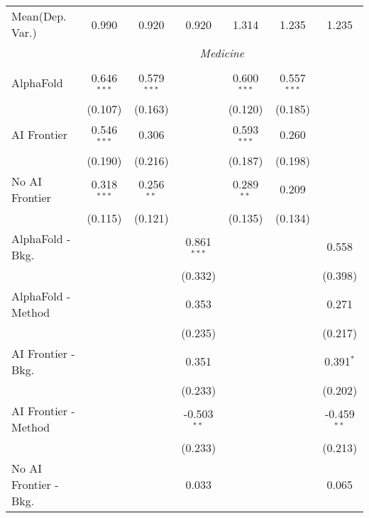\begin{tabular}{lcccccc}
Mean(Dep. Var.) & 0.990 & 0.920 & 0.920 & 1.314 & 1.235 & 1.235 \\
 & \multicolumn{6}{c}{\textit{Medicine}} \\ \\
   AlphaFold               & 0.646$^{***}$ & 0.579$^{***}$ &               & 0.600$^{***}$ & 0.557$^{***}$ &   \\   
                           & (0.107)       & (0.163)       &               & (0.120)       & (0.185)       &   \\   
   AI Frontier             & 0.546$^{***}$ & 0.306         &               & 0.593$^{***}$ & 0.260         &   \\   
                           & (0.190)       & (0.216)       &               & (0.187)       & (0.198)       &   \\   
   No AI Frontier          & 0.318$^{***}$ & 0.256$^{**}$  &               & 0.289$^{**}$  & 0.209         &   \\   
                           & (0.115)       & (0.121)       &               & (0.135)       & (0.134)       &   \\   
   AlphaFold - Bkg.        &               &               & 0.861$^{***}$ &               &               & 0.558\\   
                           &               &               & (0.332)       &               &               & (0.398)\\   
   AlphaFold - Method      &               &               & 0.353         &               &               & 0.271\\   
                           &               &               & (0.235)       &               &               & (0.217)\\   
   AI Frontier - Bkg.      &               &               & 0.351         &               &               & 0.391$^{*}$\\   
                           &               &               & (0.233)       &               &               & (0.202)\\   
   AI Frontier - Method    &               &               & -0.503$^{**}$ &               &               & -0.459$^{**}$\\   
                           &               &               & (0.233)       &               &               & (0.213)\\   
   No AI Frontier - Bkg.   &               &               & 0.033         &               &               & 0.065\\   

\end{tabular}
